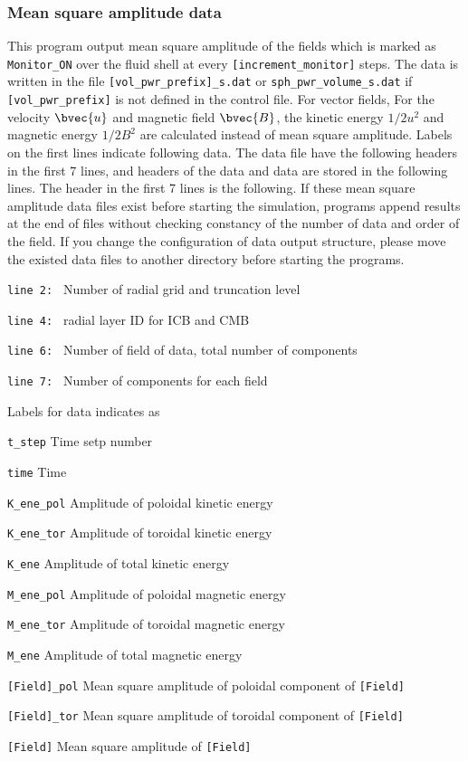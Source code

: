 \subsubsection{Mean square amplitude data}
This program output mean square amplitude of the fields which is marked as \verb|Monitor_ON| over the fluid shell at every \verb|[increment_monitor]| steps. The data is written in the file \verb|[vol_pwr_prefix]_s.dat| or  \verb|sph_pwr_volume_s.dat| if  \verb|[vol_pwr_prefix]| is not defined in the control file. For vector fields, For the velocity $\bvec{u}$ and magnetic field $\bvec{B}$, the kinetic energy $1/2 u^{2}$ and magnetic energy $1/2 B^{2}$ are calculated instead of mean square amplitude. Labels on the first lines indicate following data. The data file have the following headers in the first 7 lines, and headers of the data and data are stored in the following lines. The header in the first 7 lines is the following. If these mean square amplitude data files exist before starting the simulation, programs append results at the end of files without checking constancy of the number of data and order of the field. If you change the configuration of data output structure, please move the existed data files to another directory before starting the programs.
%
\begin{description}
\item{\tt  line 2: } Number of radial grid and truncation level
\item{\tt  line 4: } radial layer ID for ICB and CMB
\item{\tt  line 6: } Number of field of data, total number of components
\item{\tt  line 7: } Number of components for each field
\end{description}
%
Labels for data indicates as
%
\begin{description}
\item{\tt  t\_step}  Time setp number
\item{\tt  time}   Time
\item{\tt  K\_ene\_pol}  Amplitude of poloidal kinetic energy
\item{\tt  K\_ene\_tor}  Amplitude of toroidal kinetic energy
\item{\tt  K\_ene}       Amplitude of total kinetic energy
\item{\tt  M\_ene\_pol}  Amplitude of poloidal magnetic energy
\item{\tt  M\_ene\_tor}  Amplitude of toroidal magnetic energy
\item{\tt  M\_ene}       Amplitude of total magnetic energy
\item{\tt  [Field]\_pol} Mean square amplitude of poloidal component of {\tt [Field]}
\item{\tt  [Field]\_tor} Mean square amplitude of toroidal component of {\tt [Field]}
\item{\tt  [Field]}      Mean square amplitude of {\tt [Field]}
\end{description}
%
